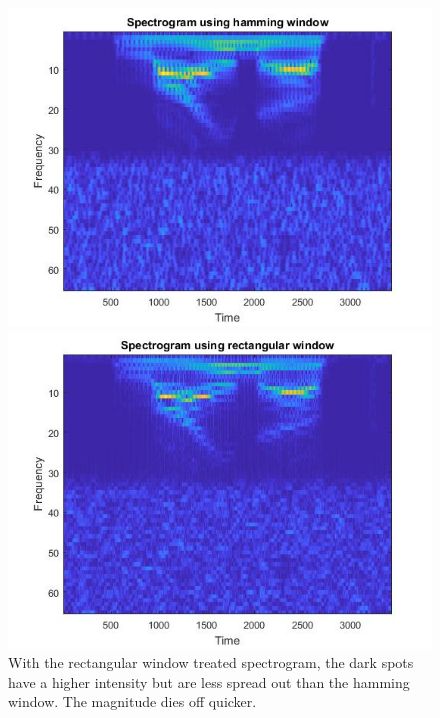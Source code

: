 \documentclass{article}
\begin{document}
\begin{figure}[H]
\includegraphics[scale = .5]{report8_1}
\includegraphics[scale = .5]{report8_2}
\\ With the rectangular window treated spectrogram, the dark spots have a higher intensity but are less spread out than the hamming window. The magnitude dies off
quicker. 
\end{figure}
\end{document}
